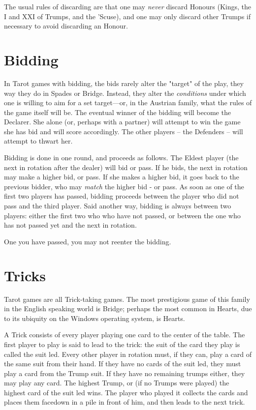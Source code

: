\documentclass[ebook,12pt,twoside,openright,extrafontsizes,final]{memoir}
\begin{document}
The usual rules of discarding are that one may \emph{never} discard Honours (Kings, the I and 
XXI of Trumps, and the ’Scuse), and one may only discard other Trumps if necessary to avoid 
discarding an Honour. 

\section{Bidding}
In Tarot games with bidding, the bids rarely alter the "target" of the play, they way 
they do in Spades or Bridge.  Instead, they alter the \emph{conditions} under which one is
willing to aim for a set target—or, in the Austrian family, what the rules of the game
itself will be.  The eventual winner of the bidding will become the Declarer. She alone
(or, perhaps with a partner) will attempt to win the game she has bid and will score
accordingly.  The other players – the Defenders – will attempt to thwart her.

Bidding is done in one round, and proceeds as follows. The Eldest player (the next in
rotation after the dealer) will bid or pass.  If he bids, the next in rotation may make a
higher bid, or pass.  If she makes a higher bid, it goes back to the previous bidder, 
who may \emph{match} the higher bid - or pass. As soon as one of the first two players has
passed, bidding proceeds between the player who did not pass and the third player.  Said 
another way, bidding is always between two players: either the first two who who have not
passed, or between the one who has not passed yet and the next in rotation. 

One you have passed, you may not reenter the bidding.


\section{Tricks}
Tarot games are all Trick-taking games. The most prestigious game of this family
in the English speaking world is Bridge; perhaps the most common in Hearts, due
to its ubiquity on the Windows operating system, is Hearts.

A Trick consists of every player playing one card to the center of the table. 
The first player to play is said to lead to the trick: the suit of the card
they play is called the suit led.  Every other player in rotation must, if
they can, play a card of the same suit from their hand.  If they have no cards
of the suit led, they must play a card from the Trump suit.  If they have no 
remaining trumps either, they may play any card.  The highest Trump, or (if 
no Trumps were played) the highest card of the suit led wins. The player who
played it collects the cards and places them facedown in a pile in front of
him, and then leads to the next trick.
\end{document}
